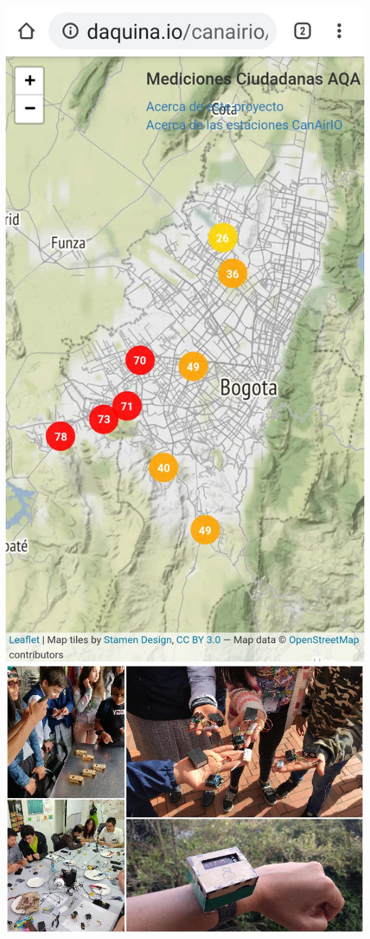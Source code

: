 \documentclass[a0paper,portrait]{baposter}
\begin{document}
\begin{poster}
{{{    	\includegraphics[scale=.078]{images/map_static_stations00.jpg}
    }
    {
        \hspace{-0.4cm}
        \centering
    	\includegraphics[scale=.3]{images/collage_square00.jpg}
    }
}

}
\end{poster}
\end{document}
